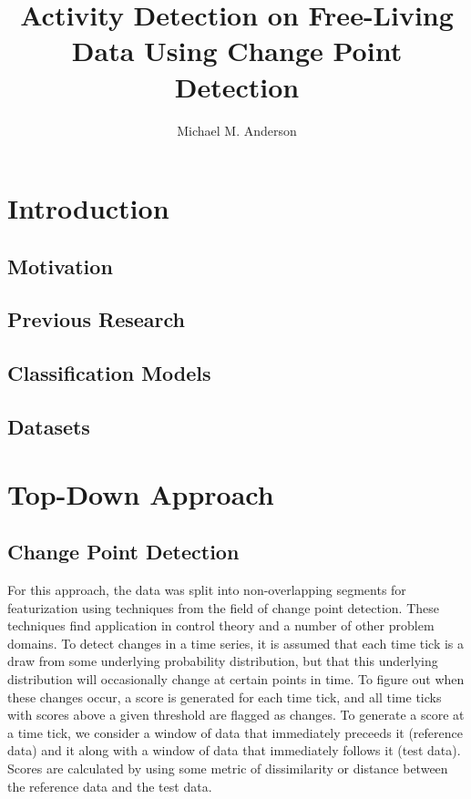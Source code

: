 \documentclass[onehalf,11pt]{beavtex}
\title{Activity Detection on Free-Living Data Using Change Point Detection}
\author{Michael M. Anderson}
\begin{document}
\maketitle
\mainmatter


\chapter{Introduction}
\section{Motivation}
\section{Previous Research}
\section{Classification Models}
\section{Datasets}




\chapter{Top-Down Approach}
\section{Change Point Detection}
For this approach, the data was split into non-overlapping segments for
featurization using techniques from the field of change point detection. 
These techniques find application in control theory and a number of other
problem domains. To detect changes in a time series, it is assumed that each
time tick is a draw from some underlying probability distribution,
but that this underlying distribution will occasionally change at certain 
points in time. To figure out when these
changes occur, a score is generated for each time tick, and all time ticks with
scores above a given threshold are flagged as changes. To generate a score at
a time tick, we consider a window of data that immediately preceeds it
(reference data) and it along with a window of data that immediately follows it (test data).
Scores are calculated by using some metric of dissimilarity or distance
between the reference data and the test data.
\end{document}
